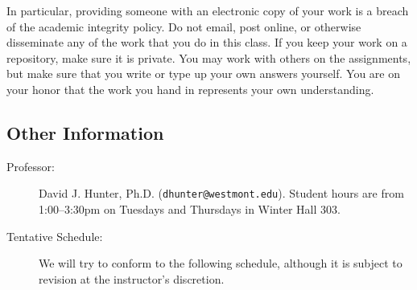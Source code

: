 \documentclass[
  twoside]{article}
\begin{document}
In particular, providing someone with an electronic copy of your work is
a breach of the academic integrity policy. Do not email, post online, or
otherwise disseminate any of the work that you do in this class. If you
keep your work on a repository, make sure it is private. You may work
with others on the assignments, but make sure that you write or type up
your own answers yourself. You are on your honor that the work you hand
in represents your own understanding.

\clearpage

\hypertarget{other-information}{%
\subsection{Other Information}\label{other-information}}

\begin{description} 

\item[Professor:] David J. Hunter, Ph.D.
  (\verb!dhunter@westmont.edu!). Student hours are from 1:00--3:30pm on Tuesdays and Thursdays in Winter Hall 303.

 \item[Tentative Schedule:] We will try to conform to the following
  schedule, although it is subject to revision at the instructor's
  discretion.
  \medskip


\end{description}
\end{document}
